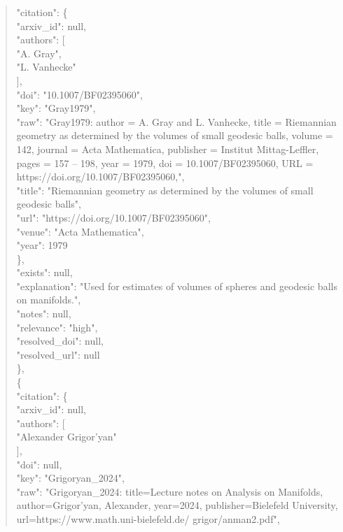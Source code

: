 \documentclass[11pt]{article}
\begin{document}
\begin{quote}
      "citation": \{\\
        "arxiv\_id": null,\\
        "authors": [\\
          "A. Gray",\\
          "L. Vanhecke"\\
        ],\\
        "doi": "10.1007/BF02395060",\\
        "key": "Gray1979",\\
        "raw": "Gray1979: author = A. Gray and L. Vanhecke, title = Riemannian geometry as determined by the volumes of small geodesic balls, volume = 142, journal = Acta Mathematica, publisher = Institut Mittag-Leffler, pages = 157 -- 198, year = 1979, doi = 10.1007/BF02395060, URL = https://doi.org/10.1007/BF02395060,",\\
        "title": "Riemannian geometry as determined by the volumes of small geodesic balls",\\
        "url": "https://doi.org/10.1007/BF02395060",\\
        "venue": "Acta Mathematica",\\
        "year": 1979\\
      \},\\
      "exists": null,\\
      "explanation": "Used for estimates of volumes of spheres and geodesic balls on manifolds.",\\
      "notes": null,\\
      "relevance": "high",\\
      "resolved\_doi": null,\\
      "resolved\_url": null\\
    \},\\
    \{\\
      "citation": \{\\
        "arxiv\_id": null,\\
        "authors": [\\
          "Alexander Grigor’yan"\\
        ],\\
        "doi": null,\\
        "key": "Grigoryan\_2024",\\
        "raw": "Grigoryan\_2024: title=Lecture notes on Analysis on Manifolds, author=Grigor’yan, Alexander, year=2024, publisher=Bielefeld University, url=https://www.math.uni-bielefeld.de/ grigor/anman2.pdf",\\

\end{quote}
\end{document}
